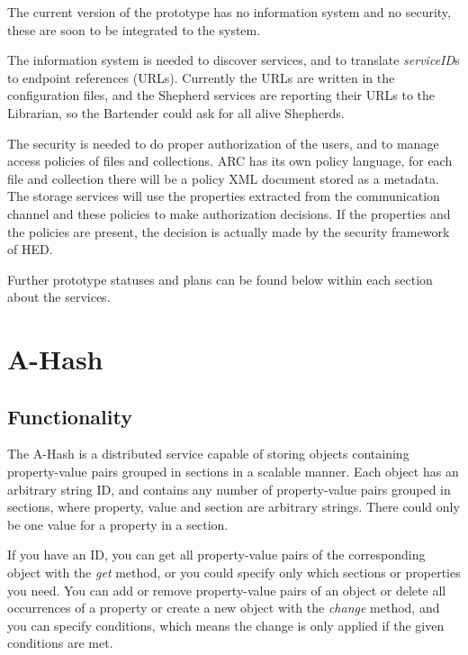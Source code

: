 \documentclass{book}
\begin{document}
The current version of the prototype has no information system and no security, these are soon to be integrated to the system.

The information system is needed to discover services, and to translate \emph{serviceID}s to endpoint references (URLs). Currently the URLs are written in the configuration files, and the Shepherd services are reporting their URLs to the Librarian, so the Bartender could ask for all alive Shepherds.

The security is needed to do proper authorization of the users, and to manage access policies of files and collections. ARC has its own policy language, for each file and collection there will be a policy XML document stored as a metadata. The storage services will use the properties extracted from the communication channel and these policies to make authorization decisions. If the properties and the policies are present, the decision is actually made by the security framework of HED.


Further prototype statuses and plans can be found below within each section about the services.

\newpage

\section{A-Hash} %
\label{sec:a_hash}

\subsection{Functionality} %

The A-Hash is a distributed service capable of storing objects containing property-value pairs grouped in sections in a scalable manner. Each object has an arbitrary string ID, and contains any number of property-value pairs grouped in sections, where property, value and section are arbitrary strings. There could only be one value for a property in a section.

If you have an ID, you can get all property-value pairs of the corresponding object with the \emph{get} method, or you could specify only which sections or properties you need. You can add or remove property-value pairs of an object or delete all occurrences of a property or create a new object with the \emph{change} method, and you can specify conditions, which means the change is only applied if the given conditions are met.
\end{document}
